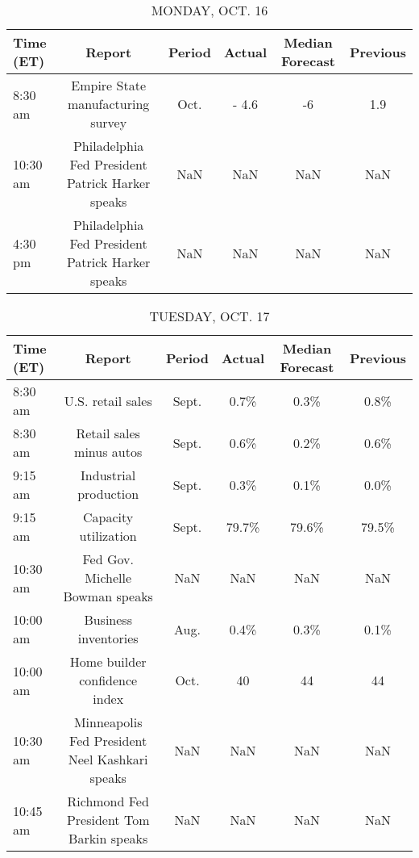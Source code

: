 \documentclass{article}%
\begin{document}
%
\normalsize%


\begin{table}[htbp]%
\caption{MONDAY, OCT. 16}%
\centering%
\begin{adjustbox}{width=1\textwidth}%
\begin{tabular}{lccccc}
\toprule
Time (ET) &                                           Report & Period & Actual & Median Forecast & Previous \\
\midrule
  8:30 am &                Empire State manufacturing survey &   Oct. &  - 4.6 &              -6 &      1.9 \\
 10:30 am & Philadelphia Fed President Patrick Harker speaks &    NaN &    NaN &             NaN &      NaN \\
  4:30 pm & Philadelphia Fed President Patrick Harker speaks &    NaN &    NaN &             NaN &      NaN \\
\bottomrule
\end{tabular}
%
\end{adjustbox}%
\end{table}

%


\begin{table}[htbp]%
\caption{TUESDAY, OCT. 17}%
\centering%
\begin{adjustbox}{width=1\textwidth}%
\begin{tabular}{lccccc}
\toprule
Time (ET) &                                         Report & Period & Actual & Median Forecast & Previous \\
\midrule
  8:30 am &                              U.S. retail sales &  Sept. &   0.7\% &            0.3\% &     0.8\% \\
  8:30 am &                       Retail sales minus autos &  Sept. &   0.6\% &            0.2\% &     0.6\% \\
  9:15 am &                          Industrial production &  Sept. &   0.3\% &            0.1\% &     0.0\% \\
  9:15 am &                           Capacity utilization &  Sept. &  79.7\% &           79.6\% &    79.5\% \\
 10:30 am &                Fed Gov. Michelle Bowman speaks &    NaN &    NaN &             NaN &      NaN \\
 10:00 am &                           Business inventories &   Aug. &   0.4\% &            0.3\% &     0.1\% \\
 10:00 am &                  Home builder confidence index &   Oct. &     40 &              44 &       44 \\
 10:30 am & Minneapolis Fed President Neel Kashkari speaks &    NaN &    NaN &             NaN &      NaN \\
 10:45 am &       Richmond Fed President Tom Barkin speaks &    NaN &    NaN &             NaN &      NaN \\
\bottomrule
\end{tabular}
%
\end{adjustbox}%
\end{table}
\end{document}
